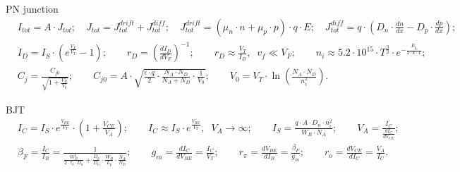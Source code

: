 \documentclass[11pt]{article}
\begin{document}
\thispagestyle{fancy}

\begin{sectionbox}{PN junction}
\begin{align*}
& I_{tot} = A \cdot J_{tot}; \quad 
     J_{tot} = J_{tot}^{drift} + J_{tot}^{diff}; \quad 
     J_{tot}^{drift} = (\mu_n \cdot n + \mu_p \cdot p) \cdot q \cdot E; \quad
     J_{tot}^{diff} = q \cdot \left( D_n \cdot \frac{d n}{d x} - D_p \cdot \frac{d p}{d x} \right); \\[0.5em]
& I_D = I_S \cdot (e^{\frac{V_F}{V_T}} - 1); \qquad
  r_D = \left( \frac{d I_D}{d V_F} \right)^{-1}; \qquad r_D \approx \frac{V_T}{I_D}, \;\; v_f \ll V_F; \qquad
  n_i \approx 5.2 \cdot 10^{15} \cdot T^{\frac{3}{2}} \cdot e^{-\frac{E_g}{2 \cdot k \cdot T}}; \\[0.5em]
& C_j = \frac{C_{j0}}{\sqrt{1 + \frac{V_R}{V_0}}}; \qquad
  C_{j0} = A \cdot \sqrt{\frac{\epsilon \cdot q}{2} \cdot \frac{N_A \cdot N_D}{N_A + N_D} \cdot \frac{1}{V_0}}; \qquad
  V_0 = V_T \cdot \ln \left( \frac{N_A \cdot N_D}{n_i^2} \right).
\end{align*}
\end{sectionbox}

\begin{sectionbox}{BJT}
\begin{align*}
& I_C = I_S \cdot e^{\frac{V_{BE}}{V_T}} \cdot (1 + \frac{V_{CE}}{V_A}); \qquad
  I_C \approx I_S \cdot e^{\frac{V_{BE}}{V_T}}, \;\; V_A \rightarrow \infty; \qquad
  I_S = \frac{q \cdot A \cdot D_n \cdot n_i^2}{W_B \cdot N_A}; \qquad
  V_A = \frac{I_C^{\prime}}{\frac{d I_C}{d V_{CE}}}; \\[0.5em]
& \beta_F = \frac{I_C}{I_B} = \frac{1}{\frac{W_B^2}{2 \cdot \tau_b \cdot D_n} + \frac{D_p}{D_n} \cdot \frac{W_B}{L_p} \cdot \frac{N_A}{N_D}}; \qquad
  g_m = \frac{d I_C}{d V_{BE}} = \frac{I_C}{V_T}; \qquad
  r_{\pi} = \frac{d V_{BE}}{d I_B} = \frac{\beta_F}{g_m}; \qquad %
  r_o = \frac{d V_{CE}}{d I_C} = \frac{V_A}{I_C}. 
\end{align*}
\end{sectionbox}
\end{document}
